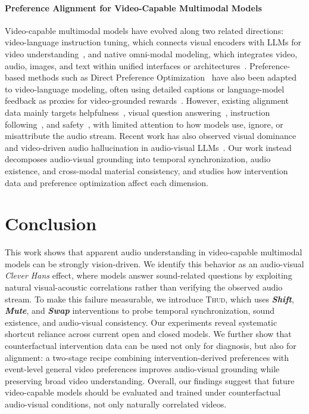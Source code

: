 \documentclass{llmxive}
\providecommand{\Thud}{\textsc{Thud}\xspace}
\providecommand{\shift}{\textbf{\textit{Shift}}\xspace}
\providecommand{\mute}{\textbf{\textit{Mute}}\xspace}
\providecommand{\swap}{\textbf{\textit{Swap}}\xspace}
\begin{document}
\paragraph{Preference Alignment for Video-Capable Multimodal Models}
Video-capable multimodal models have evolved along two related directions: video-language instruction tuning, which connects visual encoders with LLMs for video understanding~\cite{DBLP:conf/emnlp/LinYZCNJ024,DBLP:conf/nips/Dai0LTZW0FH23}, and native omni-modal modeling, which integrates video, audio, images, and text within unified interfaces or architectures~\cite{hurst2024gpt,qwenteam2026qwen35omnitechnicalreport,li2025baichuan}. Preference-based methods such as Direct Preference Optimization~\cite{rafailov2023direct} have also been adapted to video-language modeling, often using detailed captions or language-model feedback as proxies for video-grounded rewards~\cite{zhang-etal-2025-direct}. However, existing alignment data mainly targets helpfulness~\cite{DBLP:conf/nips/Ouyang0JAWMZASR22,Bai2022TrainingAH}, visual question answering~\cite{NEURIPS2023_6dcf277e}, instruction following~\cite{wei2022finetuned}, and safety~\cite{Zong2024SafetyFA,Zhu2025OmniGuardUO}, with limited attention to how models use, ignore, or misattribute the audio stream. Recent work has also observed visual dominance and video-driven audio hallucination in audio-visual LLMs~\cite{selvakumar2026audio,baid2026don}. Our work instead decomposes audio-visual grounding into temporal synchronization, audio existence, and cross-modal material consistency, and studies how intervention data and preference optimization affect each dimension.
\vspace{-0.5em}
\section{Conclusion}

This work shows that apparent audio understanding in video-capable multimodal models can be strongly vision-driven. We identify this behavior as an audio-visual \textit{Clever Hans} effect, where models answer sound-related questions by exploiting natural visual-acoustic correlations rather than verifying the observed audio stream. To make this failure measurable, we introduce \Thud, which uses \shift, \mute, and \swap interventions to probe temporal synchronization, sound existence, and audio-visual consistency. Our experiments reveal systematic shortcut reliance across current open and closed models. We further show that counterfactual intervention data can be used not only for diagnosis, but also for alignment: a two-stage recipe combining intervention-derived preferences with event-level general video preferences improves audio-visual grounding while preserving broad video understanding. Overall, our findings suggest that future video-capable models should be evaluated and trained under counterfactual audio-visual conditions, not only naturally correlated videos.
\end{document}
